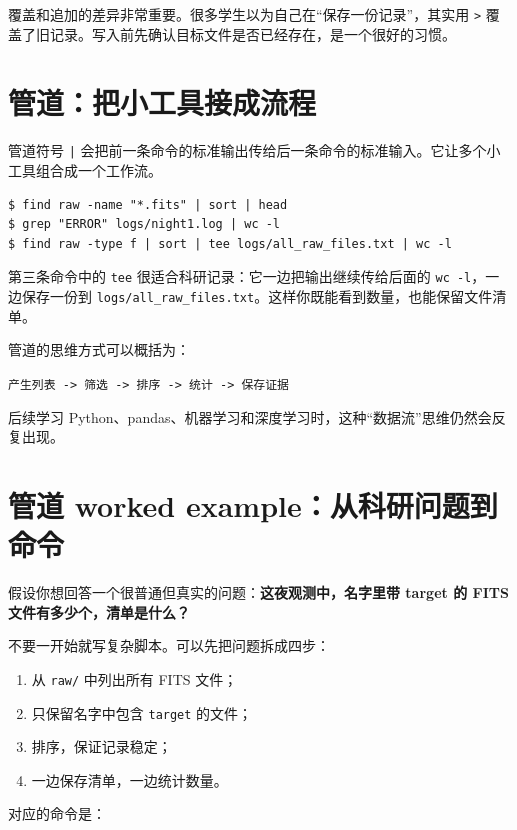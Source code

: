 覆盖和追加的差异非常重要。很多学生以为自己在“保存一份记录”，其实用 \texttt{>} 覆盖了旧记录。写入前先确认目标文件是否已经存在，是一个很好的习惯。

\section{管道：把小工具接成流程}

管道符号 \texttt{|} 会把前一条命令的标准输出传给后一条命令的标准输入。它让多个小工具组合成一个工作流。

\begin{examplebox}[管道示例]
\begin{lstlisting}[style=terminal]
$ find raw -name "*.fits" | sort | head
$ grep "ERROR" logs/night1.log | wc -l
$ find raw -type f | sort | tee logs/all_raw_files.txt | wc -l
\end{lstlisting}
\end{examplebox}

第三条命令中的 \texttt{tee} 很适合科研记录：它一边把输出继续传给后面的 \texttt{wc -l}，一边保存一份到 \texttt{logs/all\_raw\_files.txt}。这样你既能看到数量，也能保留文件清单。

管道的思维方式可以概括为：

\begin{center}
\texttt{产生列表 -> 筛选 -> 排序 -> 统计 -> 保存证据}
\end{center}

后续学习 Python、pandas、机器学习和深度学习时，这种“数据流”思维仍然会反复出现。

\section{管道 worked example：从科研问题到命令}

假设你想回答一个很普通但真实的问题：\textbf{这夜观测中，名字里带 target 的 FITS 文件有多少个，清单是什么？}

不要一开始就写复杂脚本。可以先把问题拆成四步：

\begin{enumerate}
    \item 从 \texttt{raw/} 中列出所有 FITS 文件；
    \item 只保留名字中包含 \texttt{target} 的文件；
    \item 排序，保证记录稳定；
    \item 一边保存清单，一边统计数量。
\end{enumerate}

对应的命令是：


